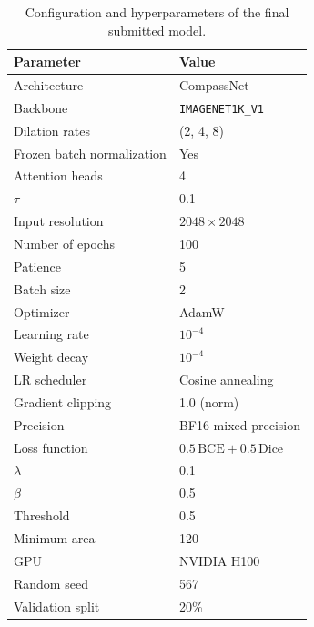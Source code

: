\documentclass[sigconf]{acmart}
\begin{document}
\begin{table}[H]
    \centering
    \caption{Configuration and hyperparameters of the final submitted model.}
    \label{tab:params}
    \footnotesize
    \renewcommand{\arraystretch}{1.15}
    \setlength{\tabcolsep}{5pt}
    \begin{tabular}{@{}ll@{}}
        \toprule
        \textbf{Parameter} & \textbf{Value} \\
        \midrule
        Architecture       & CompassNet \\
        Backbone & \texttt{IMAGENET1K\_V1} \\
        Dilation rates     & (2, 4, 8) \\
        Frozen batch normalization & Yes \\
        Attention heads    & 4 \\
        $\tau$              & 0.1 \\
        \midrule
        Input resolution   & $2048 \times 2048$ \\
        Number of epochs   & 100 \\
        Patience           & 5 \\
        Batch size         & 2 \\
        Optimizer          & AdamW \\
        Learning rate      & $10^{-4}$ \\
        Weight decay       & $10^{-4}$ \\
        LR scheduler       & Cosine annealing \\
        Gradient clipping  & 1.0 (norm) \\
        Precision          & BF16 mixed precision \\
        Loss function      & $0.5\,\text{BCE} + 0.5\,\text{Dice}$ \\
        $\lambda$          & 0.1 \\
        $\beta$            & 0.5 \\
        \midrule
        Threshold          & 0.5 \\
        Minimum area       & 120 \\
        \midrule
        GPU                & NVIDIA H100 \\
        Random seed        & 567 \\
        Validation split   & 20\% \\
        \bottomrule
    \end{tabular}
\end{table}



\end{document}
